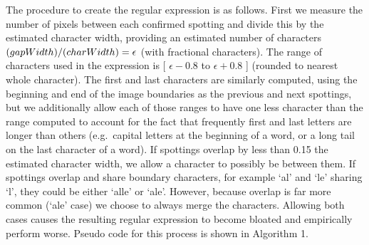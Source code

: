 \documentclass[ms,electronic,twosidetoc,letterpaper,chaptercenter,parttop,lof,lot]{byumsphd}
\begin{document}
The procedure to create the regular expression is as follows. First we measure the number of pixels between each confirmed spotting and divide this by the estimated character width, providing an estimated number of characters $\text(gapWidth)/\text(charWidth) = \epsilon$ (with fractional characters). The range of characters used in the expression is 
[ $\epsilon-0.8$ to $\epsilon+0.8$ ] (rounded to nearest whole character).
 The first and last characters are similarly computed, using the beginning and end of the image boundaries as the previous and next spottings, but we additionally allow each of those ranges to have one less character than the range computed to account for the fact that frequently first and last letters are longer than others (e.g.~capital letters at the beginning of a word, or a long tail on the last character of a word). If spottings overlap by less than 0.15 the estimated character width, we allow a character to possibly be between them.
If spottings overlap and share boundary characters, for example `al' and `le' sharing `l', they could be either `alle' or `ale'. However, because overlap is far more common (`ale' case) we choose to always merge the characters.  Allowing both cases causes the resulting regular expression to become bloated and empirically perform worse.
Pseudo code for this process is shown in Algorithm 1.%
\end{document}
